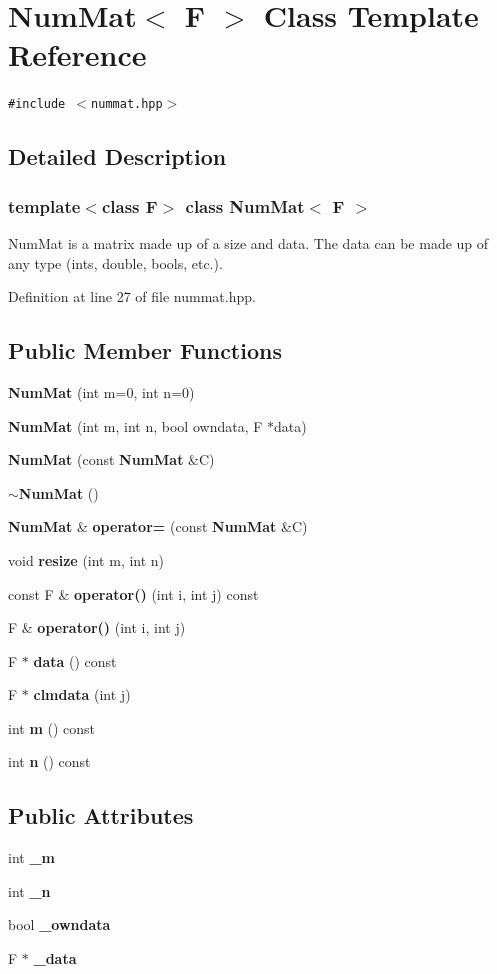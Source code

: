 \section{Num\-Mat$<$ F $>$ Class Template Reference}
\label{classNumMat}
{\tt \#include $<$nummat.hpp$>$}



\subsection{Detailed Description}
\subsubsection*{template$<$class F$>$ class Num\-Mat$<$ F $>$}

Num\-Mat is a matrix made up of a size and data. The data can be made up of any type (ints, double, bools, etc.). 



Definition at line 27 of file nummat.hpp.\subsection*{Public Member Functions}
\begin{CompactItemize}
\item 
{\bf Num\-Mat} (int m=0, int n=0)
\item 
{\bf Num\-Mat} (int m, int n, bool owndata, F $\ast$data)
\item 
{\bf Num\-Mat} (const {\bf Num\-Mat} \&C)
\item 
{\bf $\sim$Num\-Mat} ()
\item 
{\bf Num\-Mat} \& {\bf operator=} (const {\bf Num\-Mat} \&C)
\item 
void {\bf resize} (int m, int n)
\item 
const F \& {\bf operator()} (int i, int j) const 
\item 
F \& {\bf operator()} (int i, int j)
\item 
F $\ast$ {\bf data} () const 
\item 
F $\ast$ {\bf clmdata} (int j)
\item 
int {\bf m} () const 
\item 
int {\bf n} () const 
\end{CompactItemize}
\subsection*{Public Attributes}
\begin{CompactItemize}
\item 
int {\bf \_\-m}
\item 
int {\bf \_\-n}
\item 
bool {\bf \_\-owndata}
\item 
F $\ast$ {\bf \_\-data}
\end{CompactItemize}


